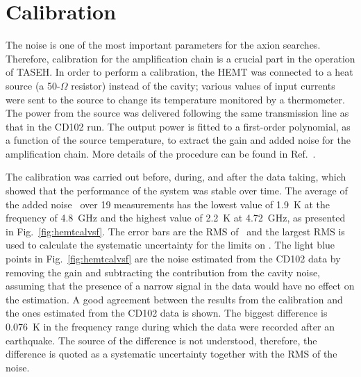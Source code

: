 \section{Calibration} \label{sec:hemtcalibration}
\label{sec:calibration}

The noise is one of the most important parameters for the axion searches. 
Therefore, calibration for the amplification chain is a 
crucial part in the operation of TASEH. In order to perform a calibration, 
the HEMT was connected to a heat source (a 50-$\Omega$ resistor) instead of 
the cavity; 
various values of input currents were sent to the source to change its 
temperature monitored by a thermometer. The power from the source 
was delivered following the same transmission line as that in the CD102 
run. 
The output power is fitted to a first-order polynomial, as a function of 
the source temperature, to extract the gain and added noise for the 
amplification chain. More details of the 
procedure can be found in Ref.~\cite{TASEHInstrumentation}. 

The calibration was carried out before, during, and after the data taking, 
which showed that the performance of the system was stable over time. The 
average of the added noise \ta\ over 19 measurements has the lowest value of 
1.9~K at the frequency of 4.8~GHz and the highest value of 
2.2~K at 4.72~GHz, as presented in Fig.~\ref{fig:hemtcalvsf}. 
The error bars are the RMS of \ta\ and the largest RMS is used to calculate 
the systematic uncertainty for the limits on \gagg. The light blue points in 
Fig.~\ref{fig:hemtcalvsf} are the noise estimated from the CD102 data by 
removing the gain and subtracting the contribution from the cavity noise, 
assuming 
that the presence of a narrow signal in the data would have no effect on the 
estimation. A good agreement between the results from the calibration  
and the ones estimated from the CD102 data is shown. The biggest 
difference is 0.076~K in the frequency range during which the data were 
recorded after an earthquake. The source of the difference is not understood, 
therefore, the difference is quoted as a systematic uncertainty together 
with the RMS of the noise.

